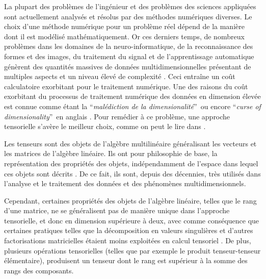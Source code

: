 \documentclass[11pt,a4paper,oneside]{book}
\begin{document}
La plupart des problèmes de l'ingénieur et des problèmes des sciences appliquées sont actuellement analysés et résolus par des méthodes numériques diverses.
Le choix d'une méthode numérique pour un problème réel dépend de la manière dont il est modélisé mathématiquement. Or ces derniers temps, de nombreux problèmes dans les domaines de la neuro-informatique,
de la reconnaissance des formes et des images, du traitement
du signal et de l'apprentissage automatique génèrent des
quantités massives de données multidimensionnelles
présentant de multiples aspects et un niveau élevé de
complexité \cite[p.1]{cichocki2014era}.
 Ceci entraîne un coût calculatoire exorbitant pour le traitement numérique. Une des raisons du coût exorbitant du processus de traitement numérique des données en dimension élevée est connue comme étant la \textquotedblleft \textit{malédiction de la dimensionalité}\textquotedblright\,
ou encore \textquotedblleft\textit{curse of dimensionality}\textquotedblright\, en anglais \cite[p.155]{cichocki2015tensor}. Pour remédier à ce problème, une approche tensorielle s'avère le meilleur choix, comme on peut le lire dans \cite{hackbusch2012tensor}.\\
\par  Les tenseurs sont des objets de l'algèbre multilinéaire généralisant les vecteurs et les matrices de l'algèbre linéaire. Ils ont pour philosophie de base, la représentation des propriétés des objets, indépendamment de l'espace dans lequel ces objets sont décrits \cite[p.11]{Maurice2010}. 
De ce fait, ils sont, depuis des décennies, très utilisés dans l'analyse et le traitement des données et des phénomènes multidimensionnels.\\
\par Cependant, certaines propriétés des objets de l'algèbre linéaire, telles que le rang d'une matrice, ne se généralisent pas de manière unique dans l'approche tensorielle, et donc en dimension supérieure à deux, avec comme conséquence que certaines pratiques telles que la décomposition en valeurs singulières et d'autres factorisations matricielles étaient moins exploitées en calcul tensoriel \cite[p.120]{Nyenyezi2018}. De plus, plusieurs opérations tensorielles (telles que par exemple le produit tenseur-tenseur élémentaire), produisent un tenseur dont le rang est supérieur à la somme des rangs des composants.\\
\end{document}
